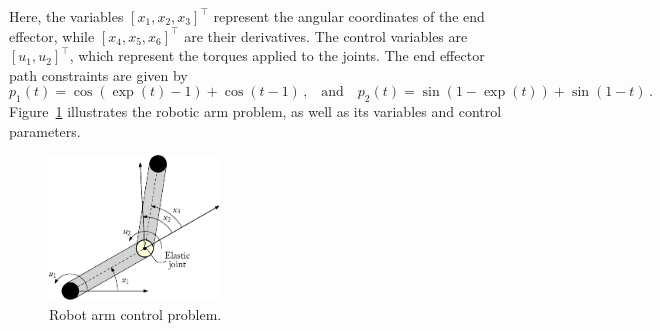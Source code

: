 %
Here, the variables $[x_1, x_2, x_3]^\top$ represent the angular coordinates of the end effector, while $[x_4, x_5, x_6]^\top$ are their derivatives. The control variables are $[u_1, u_2]^\top$, which represent the torques applied to the joints. The end effector path constraints are given by
%
\begin{equation*}
  p_1(t) = \cos(\exp(t) - 1) + \cos(t - 1) \, \text{,}
  \quad \text{and} \quad
  p_2(t) = \sin(1 - \exp(t)) + \sin(1 - t) \, \text{.}
\end{equation*}
%
Figure~\ref{chap5:fig:robotic_arm} illustrates the robotic arm problem, as well as its variables and control parameters.

\begin{figure}[htb]
  \centering
  \includegraphics[width=4.5cm]{figures/chapter_5/robotic_arm.eps}
  \caption{Robot arm control problem.}
  \label{chap5:fig:robotic_arm}
\end{figure}

